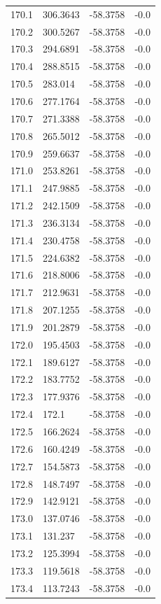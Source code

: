 \begin{table}[H]
\begin{tabular}{llll}
170.1 & 306.3643 & -58.3758 & -0.0 \\
170.2 & 300.5267 & -58.3758 & -0.0 \\
170.3 & 294.6891 & -58.3758 & -0.0 \\
170.4 & 288.8515 & -58.3758 & -0.0 \\
170.5 & 283.014 & -58.3758 & -0.0 \\
170.6 & 277.1764 & -58.3758 & -0.0 \\
170.7 & 271.3388 & -58.3758 & -0.0 \\
170.8 & 265.5012 & -58.3758 & -0.0 \\
170.9 & 259.6637 & -58.3758 & -0.0 \\
171.0 & 253.8261 & -58.3758 & -0.0 \\
171.1 & 247.9885 & -58.3758 & -0.0 \\
171.2 & 242.1509 & -58.3758 & -0.0 \\
171.3 & 236.3134 & -58.3758 & -0.0 \\
171.4 & 230.4758 & -58.3758 & -0.0 \\
171.5 & 224.6382 & -58.3758 & -0.0 \\
171.6 & 218.8006 & -58.3758 & -0.0 \\
171.7 & 212.9631 & -58.3758 & -0.0 \\
171.8 & 207.1255 & -58.3758 & -0.0 \\
171.9 & 201.2879 & -58.3758 & -0.0 \\
172.0 & 195.4503 & -58.3758 & -0.0 \\
172.1 & 189.6127 & -58.3758 & -0.0 \\
172.2 & 183.7752 & -58.3758 & -0.0 \\
172.3 & 177.9376 & -58.3758 & -0.0 \\
172.4 & 172.1 & -58.3758 & -0.0 \\
172.5 & 166.2624 & -58.3758 & -0.0 \\
172.6 & 160.4249 & -58.3758 & -0.0 \\
172.7 & 154.5873 & -58.3758 & -0.0 \\
172.8 & 148.7497 & -58.3758 & -0.0 \\
172.9 & 142.9121 & -58.3758 & -0.0 \\
173.0 & 137.0746 & -58.3758 & -0.0 \\
173.1 & 131.237 & -58.3758 & -0.0 \\
173.2 & 125.3994 & -58.3758 & -0.0 \\
173.3 & 119.5618 & -58.3758 & -0.0 \\
173.4 & 113.7243 & -58.3758 & -0.0 \\

\end{tabular}
\end{table}
